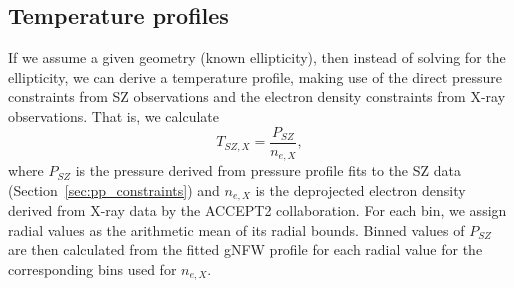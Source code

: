 \documentclass[iop,numberedappendix,apj]{emulateapj}
\begin{document}

\subsection{Temperature profiles}
\label{sec:temp_profiles}


If we assume a given geometry (known ellipticity), then instead of solving for the ellipticity, we can
derive a temperature profile, making use of the direct pressure constraints from SZ observations and the
electron density constraints from X-ray observations. That is, we calculate
\begin{equation}
  T_{SZ,X} = \frac{P_{SZ}}{n_{e,X}},
  \label{eqn:telec}
\end{equation}
where $P_{SZ}$ is the pressure derived from pressure profile fits to the SZ data (Section~\ref{sec:pp_constraints}) and
$n_{e,X}$ is the deprojected electron density derived from X-ray data by the ACCEPT2 collaboration.
For each bin, we assign radial values as the arithmetic mean of its radial bounds.
Binned values of $P_{SZ}$ are then calculated from the fitted gNFW profile for each radial value 
for the corresponding bins used for $n_{e,X}$.

\end{document}
